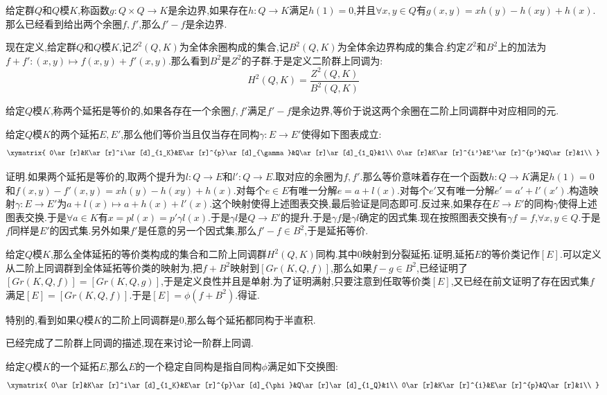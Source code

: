 给定群$Q$和$Q$模$K$,称函数$g:Q\times Q\to K$是余边界,如果存在$h:Q\to K$满足$h(1)=0$,并且$\forall x,y\in Q$有$g(x,y)=xh(y)-h(xy)+h(x)$.那么已经看到给出两个余圈$f,f'$,那么$f'-f$是余边界.

现在定义,给定群$Q$和$Q$模$K$,记$Z^2(Q,K)$为全体余圈构成的集合,记$B^2(Q,K)$为全体余边界构成的集合.约定$Z^2$和$B^2$上的加法为$f+f': (x,y)\mapsto f(x,y)+f'(x,y)$.那么看到$B^2$是$Z^2$的子群.于是定义二阶群上同调为:$$H^2(Q,K)=\frac{Z^2(Q,K)}{B^2(Q,K)}$$

给定$Q$模$K$,称两个延拓是等价的,如果各存在一个余圈$f,f'$满足$f'-f$是余边界,等价于说这两个余圈在二阶上同调群中对应相同的元.

给定$Q$模$K$的两个延拓$E,E'$,那么他们等价当且仅当存在同构$\gamma:E\to E'$使得如下图表成立:
$$\xymatrix{
	0\ar[r]&K\ar[r]^i\ar[d]_{1_K}&E\ar[r]^{p}\ar[d]_{\gamma}&Q\ar[r]\ar[d]_{1_Q}&1\\
	0\ar[r]&K\ar[r]^{i'}&E'\ar[r]^{p'}&Q\ar[r]&1\\
}$$

证明.如果两个延拓是等价的,取两个提升为$l:Q\to E$和$l':Q\to E$.取对应的余圈为$f,f'$.那么等价意味着存在一个函数$h:Q\to K$满足$h(1)=0$和$f(x,y)-f'(x,y)=xh(y)-h(xy)+h(x)$.对每个$e\in E$有唯一分解$e=a+l(x)$.对每个$e'$又有唯一分解$e'=a'+l'(x')$.构造映射$\gamma:E\to E'$为$a+l(x)\mapsto a+h(x)+l'(x)$.这个映射使得上述图表交换,最后验证是同态即可.反过来,如果存在$E\to E'$的同构$\gamma$使得上述图表交换.于是$\forall a\in K$有$x=pl(x)=p'\gamma l(x)$.于是$\gamma l$是$Q\to E'$的提升.于是$\gamma f$是$\gamma l$确定的因式集.现在按照图表交换有$\gamma f=f$,$\forall x,y\in Q$.于是$f$同样是$E'$的因式集.另外如果$f'$是任意的另一个因式集,那么$f'-f\in B^2$,于是延拓等价.

给定$Q$模$K$,那么全体延拓的等价类构成的集合和二阶上同调群$H^2(Q,K)$同构.其中0映射到分裂延拓.证明,延拓$E$的等价类记作$[E]$.可以定义从二阶上同调群到全体延拓等价类的映射为,把$f+B^2$映射到$[Gr(K,Q,f)]$,那么如果$f-g\in B^2$,已经证明了$[Gr(K,Q,f)]=[Gr(K,Q,g)]$,于是定义良性并且是单射.为了证明满射,只要注意到任取等价类$[E]$,又已经在前文证明了存在因式集$f$满足$[E]=[Gr(K,Q,f)]$.于是$[E]=\phi(f+B^2)$.得证.

特别的,看到如果$Q$模$K$的二阶上同调群是0,那么每个延拓都同构于半直积.

已经完成了二阶群上同调的描述,现在来讨论一阶群上同调.

给定$Q$模$K$的一个延拓$E$,那么$E$的一个稳定自同构是指自同构$\phi$满足如下交换图:
$$\xymatrix{
	0\ar[r]&K\ar[r]^i\ar[d]_{1_K}&E\ar[r]^{p}\ar[d]_{\phi}&Q\ar[r]\ar[d]_{1_Q}&1\\
	0\ar[r]&K\ar[r]^{i}&E\ar[r]^{p}&Q\ar[r]&1\\
}$$

